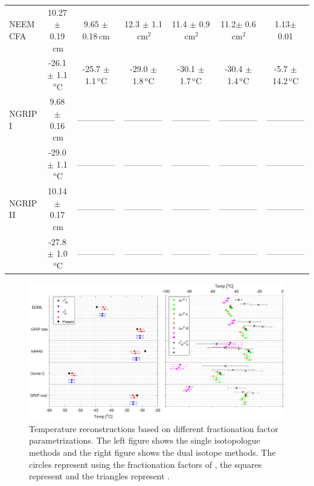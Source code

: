 \documentclass[11pt, draftcls, onecolumn]{IEEEtran} %
\numberwithin{equation}{section}
\numberwithin{table}{section}
\numberwithin{figure}{section}
\begin{document}
\begin{table}[]
\begin{tabular}{l c c c c c c}
		NEEM CFA&10.27 $\pm$ 0.19$\,\mathrm{cm}$& 9.65 $\pm$ 0.18$\,\mathrm{cm}$& 12.3 $\pm$ 1.1$\,\mathrm{cm}^2$& 11.4 $\pm$ 0.9$\,\mathrm{cm}^2$& 11.2$\pm$ 0.6$\,\mathrm{cm}^2$& 1.13$\pm$ 0.01\\
		& -26.1 $\pm$ 1.1$\,^\mathrm{o}$C & -25.7 $\pm$ 1.1$\,^\mathrm{o}$C& -29.0 $\pm$ 1.8$\,^\mathrm{o}$C& -30.1 $\pm$ 1.7$\,^\mathrm{o}$C& -30.4 $\pm$ 1.4$\,^\mathrm{o}$C & -5.7 $\pm$ 14.2$\,^\mathrm{o}$C\\
		
		NGRIP I&9.68 $\pm$ 0.16$\,\mathrm{cm}$& --------------&--------------& --------------&--------------&--------------\\
		& -29.0 $\pm$ 1.1$\,^\mathrm{o}$C & --------------&--------------&-------------- &--------------& --------------\\
		
		NGRIP II &10.14 $\pm$ 0.17$\,\mathrm{cm}$&-------------- &--------------&--------------&-------------- & --------------\\
		& -27.8 $\pm$ 1.0$\,^\mathrm{o}$C & --------------&-------------- &-------------- &-------------- &--------------\\
		\bottomrule	
	\end{tabular}
\end{table}



\begin{figure}[]
	\vspace*{2mm}
	\begin{center}
		\includegraphics[width=\textwidth]{Figure_13}
		\caption{Temperature reconstructions based on
			different fractionation factor parametrizations.
			The left figure shows the single isotopologue methods and 
			the right figure shows the dual isotope methods.
			The circles represent using the fractionation factors of \citet{Majoube1971,Merlivat1967}, 
			the squares represent \citet{Ellehoj2013} and the triangles represent \citet{Lamb2015,Majoube1971}. }  
		\label{fig:fractionation_temps}
	\end{center}
\end{figure}
\end{document}
